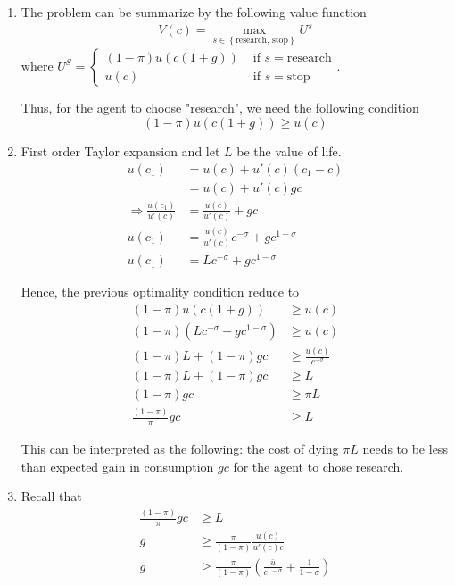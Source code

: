 \documentclass[12pt]{article}
\newcommand{\1}{{\bf 1}} %
\newcommand{\cbra}[1]{\left\{ #1 \right\}}
\newcommand{\mat}[1]{\begin{matrix}#1\end{matrix}}
\begin{document}
\begin{enumerate}[(1)]
	\item 
	
	The problem can be summarize by the following value function
	\begin{align*}
V(c)= \max_{s\in \cbra{\text{research, stop}}} U^s
	\end{align*}
	where $U^S = \left\lbrace \mat{(1-\pi)u(c(1+g)) & \text{ if }s=\text{research}\\u(c) & \text{ if }s=\text{stop}} \right. $.
	
	Thus, for the agent to choose "research", we need the following condition
	\[
	(1-\pi)u(c(1+g))\geq u(c)
	\]
	
	\item
	
	First order Taylor expansion and let $L$ be the value of life.
	\begin{align*}
		u(c_1) & = u(c)+u'(c)(c_1-c)\\
		& = u(c)+u'(c)gc\\
		\Rightarrow \frac{u(c_1)}{u'(c)} & = \frac{u(c)}{u'(c)} +gc\\
		u(c_1) & = \frac{u(c)}{u'(c)}c^{-\sigma} +gc^{1-\sigma}\\
		u(c_1) & = Lc^{-\sigma} +gc^{1-\sigma}
	\end{align*}
	
	Hence, the previous optimality condition reduce to
		\begin{align*}
(1-\pi)u(c(1+g)) &\geq u(c)\\
(1-\pi)(Lc^{-\sigma} +gc^{1-\sigma}) &\geq u(c)\\
(1-\pi)L + (1-\pi)gc &\geq \frac{u(c)}{c^{-\sigma}}\\
(1-\pi)L + (1-\pi)gc &\geq L\\
(1-\pi)gc &\geq \pi L \\
\frac{(1-\pi)}{\pi} gc &\geq L
	\end{align*}
	 
	 This can be interpreted as the following: the cost of dying $\pi L$ needs to be less than expected gain in consumption $gc$ for the agent to chose research.
	\item 
	
	Recall that 
			\begin{align*}
	\frac{(1-\pi)}{\pi} gc &\geq L\\
	g &\geq  \frac{\pi}{(1-\pi)} \frac{u(c)}{u'(c)c}\\
	g &\geq  \frac{\pi}{(1-\pi)} \left( \frac{\bar{u}}{c^{1-\sigma}} + \frac{1}{1-\sigma}\right)
	\end{align*}
	

\end{enumerate}
\end{document}
